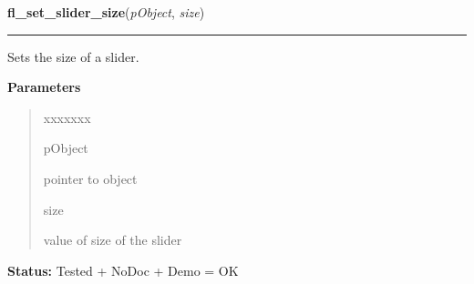     \label{xformslib:library:fl_set_slider_size}

    \vspace{0.5ex}

\hspace{.8\funcindent}\begin{boxedminipage}{\funcwidth}

    \raggedright \textbf{fl\_set\_slider\_size}(\textit{pObject}, \textit{size})

    \vspace{-1.5ex}

    \rule{\textwidth}{0.5\fboxrule}
\setlength{\parskip}{2ex}
    Sets the size of a slider.

\setlength{\parskip}{1ex}
      \textbf{Parameters}
      \vspace{-1ex}

      \begin{quote}
        \begin{Ventry}{xxxxxxx}

          \item[pObject]

          pointer to object

          \item[size]

          value of size of the slider

        \end{Ventry}

      \end{quote}

\textbf{Status:} Tested + NoDoc + Demo = OK



    \end{boxedminipage}

    \label{xformslib:library:fl_set_slider_precision}

    \vspace{0.5ex}


